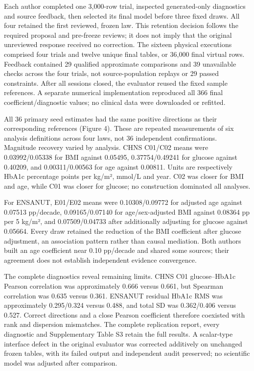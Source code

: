 \documentclass[11pt,letterpaper]{article}
\begin{document}
Each author completed one 3,000-row trial, inspected generated-only diagnostics and source feedback, then selected its final model before three fixed draws. All four retained the first reviewed, frozen law. This retention decision follows the required proposal and pre-freeze reviews; it does not imply that the original unreviewed response received no correction. The sixteen physical executions comprised four trials and twelve unique final tables, or 36,000 final virtual rows. Feedback contained 29 qualified approximate comparisons and 39 unavailable checks across the four trials, not source-population replays or 29 passed constraints. After all sessions closed, the evaluator reused the fixed sample references. A separate numerical implementation reproduced all 366 final coefficient/\allowbreak{}diagnostic values; no clinical data were downloaded or refitted.


All 36 primary seed estimates had the same positive directions as their corresponding references (Figure 4). These are repeated measurements of six analysis definitions across four laws, not 36 independent confirmations. Magnitude recovery varied by analysis. CHNS C01/\allowbreak{}C02 means were 0.03992/\allowbreak{}0.05338 for BMI against 0.05495, 0.37754/\allowbreak{}0.49241 for glucose against 0.40209, and 0.00311/\allowbreak{}0.00563 for age against 0.00811. Units are respectively HbA1c percentage points per kg/\allowbreak{}m², mmol/\allowbreak{}L and year. C02 was closer for BMI and age, while C01 was closer for glucose; no construction dominated all analyses.


For ENSANUT, E01/\allowbreak{}E02 means were 0.10308/\allowbreak{}0.09772 for adjusted age against 0.07513 pp/\allowbreak{}decade, 0.09165/\allowbreak{}0.07140 for age/\allowbreak{}sex-adjusted BMI against 0.08364 pp per 5 kg/\allowbreak{}m², and 0.07509/\allowbreak{}0.04733 after additionally adjusting for glucose against 0.05664. Every draw retained the reduction of the BMI coefficient after glucose adjustment, an association pattern rather than causal mediation. Both authors built an age coefficient near 0.10 pp/\allowbreak{}decade and shared some sources; their agreement does not establish independent evidence convergence.


The complete diagnostics reveal remaining limits. CHNS C01 glucose–\allowbreak{}HbA1c Pearson correlation was approximately 0.666 versus 0.661, but Spearman correlation was 0.635 versus 0.361. ENSANUT residual HbA1c RMS was approximately 0.295/\allowbreak{}0.324 versus 0.488, and total SD was 0.362/\allowbreak{}0.406 versus 0.527. Correct directions and a close Pearson coefficient therefore coexisted with rank and dispersion mismatches. The complete replication report, every diagnostic and Supplementary Table S3 retain the full results. A scalar-type interface defect in the original evaluator was corrected additively on unchanged frozen tables, with its failed output and independent audit preserved; no scientific model was adjusted after comparison.
\end{document}

